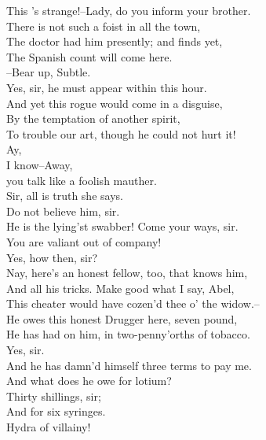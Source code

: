 \documentclass{memoir}
\begin{document}
\begin{drama*}
\surlyspeaks  This 's strange!--Lady, do you inform your brother.\\
\facespeaks  There is not such a foist in all the town,\\
 The doctor had him presently; and finds yet,\\
 The Spanish count will come here.\\
 --Bear up, Subtle.\\
\subtlespeaks {} Yes, sir, he must appear within this hour.\\
\facespeaks  And yet this rogue would come in a disguise,\\
 By the temptation of another spirit,\\
 To trouble our art, though he could not hurt it!\\
\kastrilspeaks  Ay,\\
 I know--Away,\\
 you talk like a foolish mauther.\\
\surlyspeaks {} Sir, all is truth she says.\\
\facespeaks  Do not believe him, sir.\\
 He is the lying'st swabber! Come your ways, sir.\\
\surlyspeaks  You are valiant out of company!\\
\kastrilspeaks {} Yes, how then, sir?\\
\facespeaks  Nay, here's an honest fellow, too, that knows him,\\
 And all his tricks. Make good what I say, Abel,\\
 This cheater would have cozen'd thee o' the widow.--\\
 He owes this honest Drugger here, seven pound,\\
 He has had on him, in two-penny'orths of tobacco.\\
\druggerspeaks  Yes, sir.\\
 And he has damn'd himself three terms to pay me.\\
\facespeaks  And what does he owe for lotium?\\
\druggerspeaks {} Thirty shillings, sir;\\
 And for six syringes.\\
\surlyspeaks {} Hydra of villainy!\\

\end{drama*}
\end{document}
